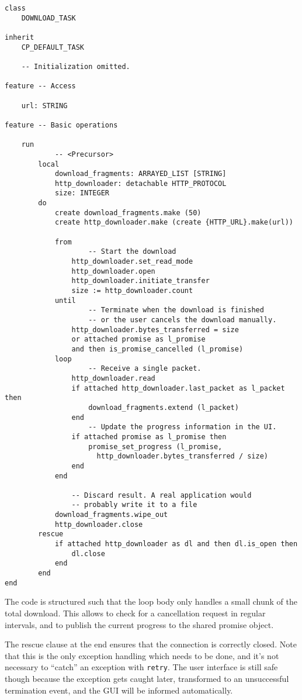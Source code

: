 \begin{lstlisting}[language=OOSC2Eiffel, label={code:download-task}, captionpos=b, caption={The background download task.}]
class
	DOWNLOAD_TASK

inherit
	CP_DEFAULT_TASK

    -- Initialization omitted.

feature -- Access

	url: STRING

feature -- Basic operations

	run
			-- <Precursor>
		local
			download_fragments: ARRAYED_LIST [STRING]
			http_downloader: detachable HTTP_PROTOCOL
			size: INTEGER
		do
			create download_fragments.make (50)
			create http_downloader.make (create {HTTP_URL}.make(url))

			from
					-- Start the download
				http_downloader.set_read_mode
				http_downloader.open
				http_downloader.initiate_transfer
				size := http_downloader.count
			until
					-- Terminate when the download is finished 
					-- or the user cancels the download manually.
				http_downloader.bytes_transferred = size 
				or attached promise as l_promise 
				and then is_promise_cancelled (l_promise)
			loop
					-- Receive a single packet.
				http_downloader.read
				if attached http_downloader.last_packet as l_packet then
					download_fragments.extend (l_packet)
				end
					-- Update the progress information in the UI.
				if attached promise as l_promise then
					promise_set_progress (l_promise, 
					  http_downloader.bytes_transferred / size)
				end
			end

				-- Discard result. A real application would
				-- probably write it to a file
			download_fragments.wipe_out
			http_downloader.close
		rescue
			if attached http_downloader as dl and then dl.is_open then
				dl.close
			end
		end
end
\end{lstlisting}

The code is structured such that the loop body only handles a small chunk of the total download.
This allows to check for a cancellation request in regular intervals, and to publish the current progress to the shared promise object.

The rescue clause at the end ensures that the connection is correctly closed.
Note that this is the only exception handling which needs to be done, and it's not necessary to ``catch'' an exception with \lstinline!retry!.
The user interface is still safe though because the exception gets caught later, transformed to an unsuccessful termination event, and the GUI will be informed automatically.


